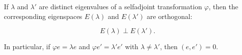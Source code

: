 If $\lambda$ and $\lambda'$ are distinct eigenvalues of a selfadjoint transformation $\varphi$, then the corresponding eigenspaces $E(\lambda)$ and $E(\lambda')$ are orthogonal:

$$E(\lambda) \perp E(\lambda').$$

In particular, if $\varphi e = \lambda e$ and $\varphi e' = \lambda' e'$ with $\lambda \neq \lambda'$, then $(e, e') = 0$.
